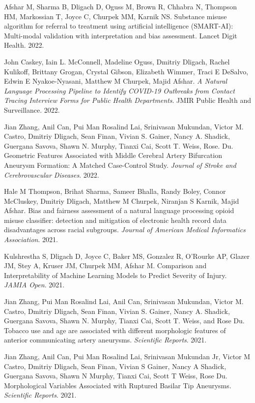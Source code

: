 \documentclass[letterpaper]{article}
\renewenvironment{itemize}{
  \begin{list}{}{
    \setlength{\leftmargin}{1.5em}
  }
}{
  \end{list}
}
\begin{document}
\begin{itemize}
\item Afshar M, Sharma B, Dligach D, Oguss M, Brown R, Chhabra N, Thompson HM, Markossian T, Joyce C, Churpek MM, Karnik NS. Substance misuse algorithm for referral to treatment using artificial intelligence (SMART-AI): Multi-modal validation with interpretation and bias assessment. Lancet Digit Health. 2022.
\item John Caskey, Iain L. McConnell, Madeline Oguss, Dmitriy Dligach, Rachel Kulikoff, Brittany Grogan, Crystal Gibson, Elizabeth Wimmer, Traci E DeSalvo, Edwin E Nyakoe-Nyasani, Matthew M Churpek, Majid Afshar. \emph{A Natural Language Processing Pipeline to Identify COVID-19 Outbreaks from Contact Tracing Interview Forms for Public Health Departments}. JMIR Public Health and Surveillance. 2022.
\item Jian Zhang, Anil Can, Pui Man Rosalind Lai, Srinivasan Mukundan, Victor M. Castro, Dmitriy Dligach, Sean Finan, Vivian S. Gainer, Nancy A. Shadick, Guergana Savova, Shawn N. Murphy, Tianxi Cai, Scott T. Weiss, Rose. Du. Geometric Features Associated with Middle Cerebral Artery Bifurcation Aneurysm Formation: A Matched Case-Control Study. \emph{Journal of Stroke and Cerebrovascular Diseases}. 2022.
\item Hale M Thompson, Brihat Sharma, Sameer Bhalla, Randy Boley, Connor McCluskey, Dmitriy Dligach, Matthew M Churpek, Niranjan S Karnik, Majid Afshar. Bias and fairness assessment of a natural language processing opioid misuse classifier: detection and mitigation of electronic health record data disadvantages across racial subgroups. \emph{Journal of American Medical Informatics Association}. 2021.
\item Kulshrestha S, Dligach D, Joyce C, Baker MS, Gonzalez R, O’Rourke AP, Glazer JM, Stey A, Kruser JM, Churpek MM, Afshar M. Comparison and Interpretability of Machine Learning Models to Predict Severity of Injury. \emph{JAMIA Open}. 2021.
\item Jian Zhang, Pui Man Rosalind Lai, Anil Can, Srinivasan Mukundan, Victor M. Castro, Dmitriy Dligach, Sean Finan, Vivian S. Gainer, Nancy A. Shadick, Guergana Savova, Shawn N. Murphy, Tianxi Cai, Scott T. Weiss, and Rose Du. Tobacco use and age are associated with different morphologic features of anterior communicating artery aneurysms. \emph{Scientific Reports}. 2021.
\item Jian Zhang, Anil Can, Pui Man Rosalind Lai, Srinivasan Mukundan Jr, Victor M Castro, Dmitriy Dligach, Sean Finan, Vivian S Gainer, Nancy A Shadick, Guergana Savova, Shawn N Murphy, Tianxi Cai, Scott T Weiss, Rose Du. Morphological Variables Associated with Ruptured Basilar Tip Aneurysms. \emph{Scientific Reports}. 2021.

\end{itemize}
\end{document}

